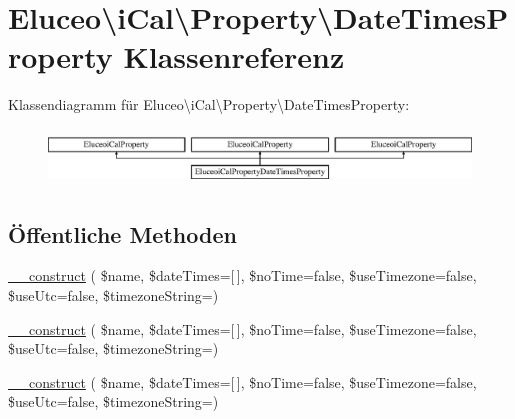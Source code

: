 \hypertarget{class_eluceo_1_1i_cal_1_1_property_1_1_date_times_property}{}\section{Eluceo\textbackslash{}i\+Cal\textbackslash{}Property\textbackslash{}Date\+Times\+Property Klassenreferenz}
\label{class_eluceo_1_1i_cal_1_1_property_1_1_date_times_property}
Klassendiagramm für Eluceo\textbackslash{}i\+Cal\textbackslash{}Property\textbackslash{}Date\+Times\+Property\+:\begin{figure}[H]
\begin{center}
\leavevmode
\includegraphics[height=1.499331cm]{class_eluceo_1_1i_cal_1_1_property_1_1_date_times_property}
\end{center}
\end{figure}
\subsection*{Öffentliche Methoden}
\begin{DoxyCompactItemize}
\item 
\mbox{\hyperlink{class_eluceo_1_1i_cal_1_1_property_1_1_date_times_property_a4ec5ddbace06214f9d0eb946b0a3265f}{\+\_\+\+\_\+construct}} ( \$name, \$date\+Times=\mbox{[}$\,$\mbox{]}, \$no\+Time=false, \$use\+Timezone=false, \$use\+Utc=false, \$timezone\+String=\textquotesingle{}\textquotesingle{})
\item 
\mbox{\hyperlink{class_eluceo_1_1i_cal_1_1_property_1_1_date_times_property_a4ec5ddbace06214f9d0eb946b0a3265f}{\+\_\+\+\_\+construct}} ( \$name, \$date\+Times=\mbox{[}$\,$\mbox{]}, \$no\+Time=false, \$use\+Timezone=false, \$use\+Utc=false, \$timezone\+String=\textquotesingle{}\textquotesingle{})
\item 
\mbox{\hyperlink{class_eluceo_1_1i_cal_1_1_property_1_1_date_times_property_a4ec5ddbace06214f9d0eb946b0a3265f}{\+\_\+\+\_\+construct}} ( \$name, \$date\+Times=\mbox{[}$\,$\mbox{]}, \$no\+Time=false, \$use\+Timezone=false, \$use\+Utc=false, \$timezone\+String=\textquotesingle{}\textquotesingle{})
\end{DoxyCompactItemize}
